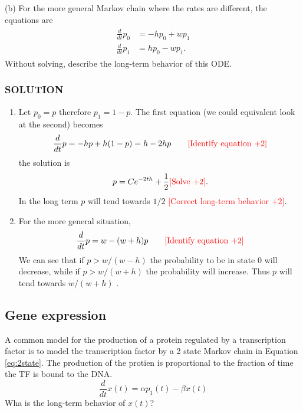\documentclass[12pt,letterpaper]{exam}
\newcommand{\pts}[1]{\textcolor{red}{[#1]}}
\begin{document}
(b) For the more general Markov chain where the rates are different, the equations are 
\begin{align}\label{eq:2state}
\begin{split}
\frac{d}{dt}p_0 &=  -hp_0 + w p_1 \\
\frac{d}{dt}p_1 &=  h p_0  - w p_1. 
\end{split}
\end{align}
Without solving, describe the long-term behavior of this ODE. 



\subsubsection*{SOLUTION}
\begin{enumerate}
\item[(a)] Let $p_0 = p$ therefore $p_1 = 1-p$. The first equation (we could equivalent look at the second) becomes 
\begin{equation}
\frac{d}{dt}p =  -hp + h (1-p) =  h - 2h p  \quad\quad \text{\pts{Identify equation +2}}
\end{equation}
the solution is 
\begin{equation}
p = Ce^{-2th} + \frac{1}{2} \text{\pts{Solve +2}}. 
\end{equation}
In the long term $p$ will tend towards $1/2$ \pts{Correct long-term behavior +2}. 
\item[(b)]  For the more general situation, 
\begin{equation}
\frac{d}{dt}p = w - (w+h) p  \quad\quad \text{\pts{Identify equation +2}}
\end{equation}
We can see that if $p> w/(w-h)$ the probability to be in state $0$ will decrease, while if $p>w/(w+h)$ the probability will increase. Thus $p$ will tend towards $w/(w+h)$ \text{\pts{Identify equation +2}}. 
\end{enumerate}


\subsection*{Gene expression}
A common model for the production of a protein regulated by a transcription factor is to model the transcription factor by a 2 state Markov chain in Equation \eqref{eq:2state}. The production of the protien is proportional to the fraction of time the TF is bound to the DNA. 
\begin{equation}
\frac{d}{dt}x(t) = \alpha p_1(t) - \beta x(t)
\end{equation}
Wha is the long-term behavior of $x(t)$? 
\end{document}
